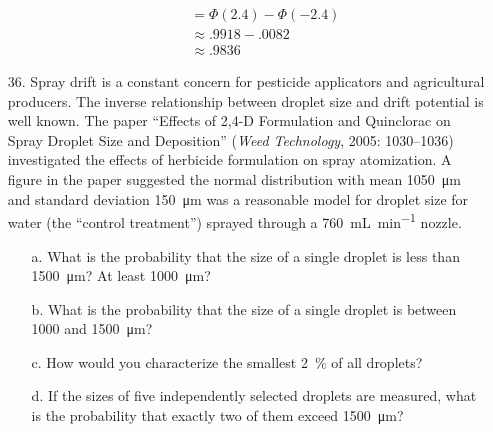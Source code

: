 \documentclass[letterpaper,12pt]{article}
\begin{document}
\begin{enumerate}
\begin{enumerate}
\begin{align*}
          &= \Phi(2.4) - \Phi(-2.4) \\
          &\approx .9918 - .0082 \\
          &\approx .9836
        \end{align*}
    \end{enumerate}
  \item[36.]
    Spray drift is a constant concern for pesticide applicators and agricultural producers. The inverse relationship between droplet size and drift potential is well known. The paper ``Effects of 2,4-D Formulation and Quinclorac on Spray Droplet Size and Deposition'' (\textit{Weed Technology}, 2005: 1030–1036) investigated the effects of herbicide formulation on spray atomization. A figure in the paper suggested the normal distribution with mean \qty{1050}{\micro\meter} and standard deviation \qty{150}{\micro\meter} was a reasonable model for droplet size for water (the ``control treatment'') sprayed through a \qty{760}{\milli\liter\per\minute} nozzle.
    \begin{enumerate}
      \item[a.]
        What is the probability that the size of a single droplet is less than \qty{1500}{\micro\meter}? At least \qty{1000}{\micro\meter}?
      \item[b.]
        What is the probability that the size of a single droplet is between 1000 and \qty{1500}{\micro\meter}?
      \item[c.]
        How would you characterize the smallest \qty{2}{\percent} of all droplets?
      \item[d.]
        If the sizes of five independently selected droplets are measured, what is the probability that exactly two of them exceed \qty{1500}{\micro\meter}?
    \end{enumerate}
\end{enumerate}
\end{document}
